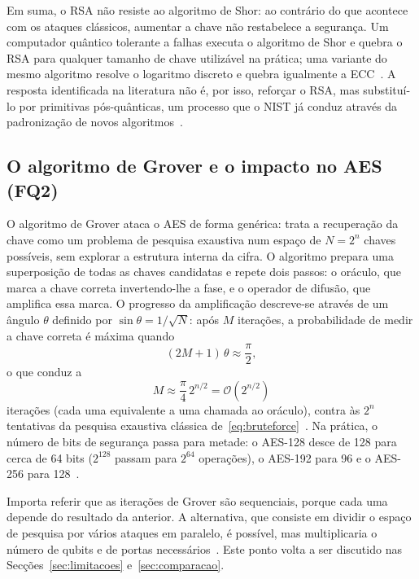 \documentclass[11pt,a4paper]{article}
\begin{document}
Em suma, o RSA não resiste ao algoritmo de Shor: ao contrário do que acontece com os ataques clássicos, aumentar a chave não restabelece a segurança. Um computador quântico tolerante a falhas executa o algoritmo de Shor e quebra o RSA para qualquer tamanho de chave utilizável na prática; uma variante do mesmo algoritmo resolve o logaritmo discreto e quebra igualmente a ECC~\cite{oonishi2026,wang2022}. A resposta identificada na literatura não é, por isso, reforçar o RSA, mas substituí-lo por primitivas pós-quânticas, um processo que o NIST já conduz através da padronização de novos algoritmos~\cite{chethana2025}.

\subsection{O algoritmo de Grover e o impacto no AES (FQ2)}\label{sec:grover}

O algoritmo de Grover ataca o AES de forma genérica: trata a recuperação da chave como um problema de pesquisa exaustiva num espaço de $N = 2^{n}$ chaves possíveis, sem explorar a estrutura interna da cifra. O algoritmo prepara uma superposição de todas as chaves candidatas e repete dois passos: o oráculo, que marca a chave correta invertendo-lhe a fase, e o operador de difusão, que amplifica essa marca. O progresso da amplificação descreve-se através de um ângulo $\theta$ definido por $\sin\theta = 1/\sqrt{N}$: após $M$ iterações, a probabilidade de medir a chave correta é máxima quando
\begin{equation}\label{eq:grover-iter}
(2M+1)\,\theta \approx \frac{\pi}{2},
\end{equation}
o que conduz a
\begin{equation}\label{eq:grover}
M \approx \frac{\pi}{4}\,2^{n/2} = \mathcal{O}\!\left(2^{n/2}\right)
\end{equation}
iterações (cada uma equivalente a uma chamada ao oráculo), contra às $2^{n}$ tentativas da pesquisa exaustiva clássica de~\eqref{eq:bruteforce}~\cite{chethana2025,wang2022}. Na prática, o número de bits de segurança passa para metade: o AES-128 desce de 128 para cerca de 64 bits ($2^{128}$ passam para $2^{64}$ operações), o AES-192 para 96 e o AES-256 para 128~\cite{chethana2025,wang2022}. 

Importa referir que as iterações de Grover são sequenciais, porque cada uma depende do resultado da anterior. A alternativa, que consiste em dividir o espaço de pesquisa por vários ataques em paralelo, é possível, mas multiplicaria o número de qubits e de portas necessários~\cite{huang2022}. Este ponto volta a ser discutido nas Secções~\ref{sec:limitacoes} e~\ref{sec:comparacao}.
\end{document}
